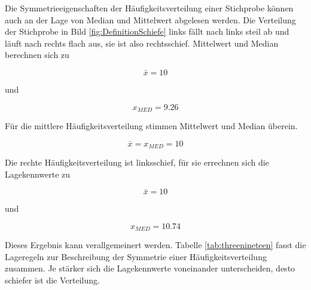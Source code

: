 \noindent Die Symmetrieeigenschaften der H\"{a}ufigkeitsverteilung einer Stichprobe k\"{o}nnen auch an der Lage von Median und Mittelwert abgelesen werden. Die Verteilung der Stichprobe in Bild \ref{fig:DefinitionSchiefe} links f\"{a}llt nach links steil ab und l\"{a}uft nach rechts flach aus, sie ist also rechtsschief. Mittelwert und Median berechnen sich zu 

\begin{equation}\label{eq:threefiftyfour}
\bar{x}=10
\end{equation} 

\noindent und 

\begin{equation}\label{eq:threefiftyfive}
x_{MED} =9.26
\end{equation} 

\noindent F\"{u}r die mittlere H\"{a}ufigkeitsverteilung stimmen Mittelwert und Median \"{u}berein. 

\begin{equation}\label{eq:threefiftysix}
\bar{x}=x_{MED} =10
\end{equation} 

\noindent Die rechte H\"{a}ufigkeitsverteilung ist linksschief, f\"{u}r sie errechnen sich die Lagekennwerte zu

\begin{equation}\label{eq:threefiftyseven}
\bar{x}=10
\end{equation} 

\noindent und

\begin{equation}\label{eq:threefiftyeight}
x_{MED} =10.74
\end{equation} 

\noindent Dieses Ergebnis kann verallgemeinert werden. Tabelle \ref{tab:threenineteen} fasst die Lageregeln zur Beschreibung der Symmetrie einer H\"{a}ufigkeitsverteilung zusammen. Je st\"{a}rker sich die Lagekennwerte voneinander unterscheiden, desto schiefer ist die Verteilung.

